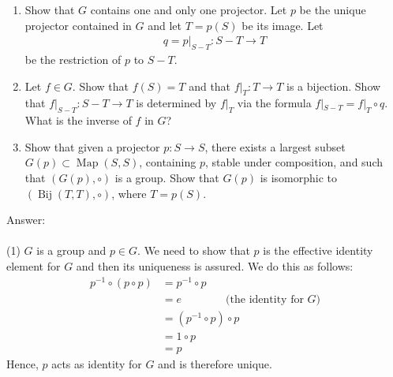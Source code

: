 \documentclass[12pt,a4paper]{article}
\begin{document}
\begin{enumerate}
\item[(1)] Show that $G$ contains one and only one projector. Let $p$ be the unique projector contained in $G$ and let $T=p(S)$ be its image. Let
\begin{align*}
q=p|_{S-T}:S-T\to T
\end{align*}
be the restriction of $p$ to $S-T$.

\item[(2)] Let $f\in G$. Show that $f(S)=T$ and that $f|_T:T\to T$ is a bijection. Show that $f|_{S-T}:S-T\to T$ is determined by $f|_T$ via the formula $f|_{S-T}=f|_T\circ q$. What is the inverse of $f$ in $G$?

\item[(3)] Show that given a projector $p:S\to S$, there exists a largest subset $G(p)\subset\operatorname{Map}(S,S)$, containing $p$, stable under composition, and such that $(G(p),\circ)$ is a group. Show that $G(p)$ is isomorphic to $(\operatorname{Bij}(T,T),\circ)$, where $T=p(S)$.
\end{enumerate}

\vspace{1cm}
\noindent
Answer:\\
\\
(1) $G$ is a group and $p \in G$.  We need to show that $p$ is the effective identity element
for $G$ and then its uniqueness is assured.  We do this as follows:
\begin{align*}
 p^{-1} \circ (p \circ p) &= p^{-1} \circ p \\
 &= e \quad \quad \quad \quad \text{(the identity for $G$)} \\
 &= (p^{-1} \circ p) \circ p \\
 &= 1 \circ p \\
 &= p
\end{align*}
Hence, $p$ acts as identity for $G$ and is therefore unique.
\end{document}
